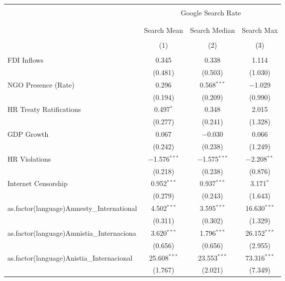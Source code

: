 
\begin{table}[!htbp] \centering 
  \caption{} 
  \label{} 
\begin{tabular}{@{\extracolsep{5pt}}lccc} 
\\[-1.8ex]\hline 
\hline \\[-1.8ex] 
 & \multicolumn{3}{c}{Google Search Rate} \\ 
\cline{2-4} 
\\[-1.8ex] & \multicolumn{3}{c}{ } \\ 
 & Search Mean & Search Median & Search Max \\ 
\\[-1.8ex] & (1) & (2) & (3)\\ 
\hline \\[-1.8ex] 
 FDI Inflows & 0.345 & 0.338 & 1.114 \\ 
  & (0.481) & (0.503) & (1.030) \\ 
  NGO Presence (Rate) & 0.296 & 0.568$^{***}$ & $-$1.029 \\ 
  & (0.194) & (0.209) & (0.990) \\ 
  HR Treaty Ratifications & 0.497$^{*}$ & 0.348 & 2.015 \\ 
  & (0.277) & (0.241) & (1.328) \\ 
  GDP Growth & 0.067 & $-$0.030 & 0.066 \\ 
  & (0.242) & (0.238) & (1.249) \\ 
  HR Violations & $-$1.576$^{***}$ & $-$1.575$^{***}$ & $-$2.208$^{**}$ \\ 
  & (0.218) & (0.238) & (0.876) \\ 
  Internet Censorship & 0.952$^{***}$ & 0.937$^{***}$ & 3.171$^{*}$ \\ 
  & (0.279) & (0.243) & (1.643) \\ 
  as.factor(language)Amnesty\_International & 4.502$^{***}$ & 3.595$^{***}$ & 16.630$^{***}$ \\ 
  & (0.311) & (0.302) & (1.329) \\ 
  as.factor(language)Amnistia\_Internaciona & 3.620$^{***}$ & 1.796$^{***}$ & 26.152$^{***}$ \\ 
  & (0.656) & (0.656) & (2.955) \\ 
  as.factor(language)Anistia\_Internacional & 25.608$^{***}$ & 23.553$^{***}$ & 73.316$^{***}$ \\ 
  & (1.767) & (2.021) & (7.349) \\ 

\end{tabular}
\end{table}

